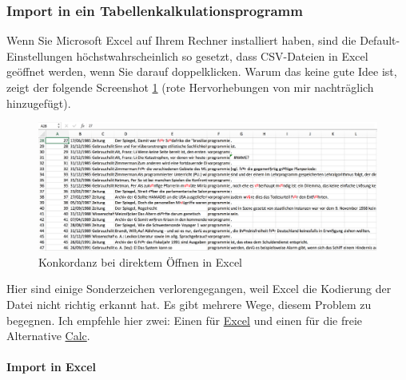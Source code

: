 \documentclass[]{article}
\let\oldparagraph\paragraph
\renewcommand{\paragraph}[1]{\oldparagraph{#1}\mbox{}}
\begin{document}
\subsubsection{Import in ein
Tabellenkalkulationsprogramm}\label{import-in-ein-tabellenkalkulationsprogramm}

Wenn Sie Microsoft Excel auf Ihrem Rechner installiert haben, sind die
Default-Einstellungen höchstwahrscheinlich so gesetzt, dass CSV-Dateien
in Excel geöffnet werden, wenn Sie darauf doppelklicken. Warum das keine
gute Idee ist, zeigt der folgende Screenshot \ref{fig:excel1} (rote
Hervorhebungen von mir nachträglich hinzugefügt).

\begin{figure}
\includegraphics[width=5.04in]{fig/conc_in_excel_bad} \caption{Konkordanz bei direktem Öffnen in Excel}\label{fig:excel1}
\end{figure}

Hier sind einige Sonderzeichen verlorengegangen, weil Excel die
Kodierung der Datei nicht richtig erkannt hat. Es gibt mehrere Wege,
diesem Problem zu begegnen. Ich empfehle hier zwei: Einen für
\protect\hyperlink{import-in-excel}{Excel} und einen für die freie
Alternative \protect\hyperlink{import-in-calc}{Calc}.

\hypertarget{import-in-excel}{\paragraph{Import in
Excel}\label{import-in-excel}}
\end{document}

